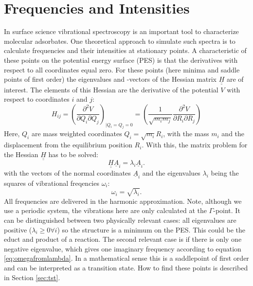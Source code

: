 \documentclass[11pt,DIV=13,BCOR=5mm,a4paper,headinclude]{scrbook}
\renewcommand{\vec}[1]{\underline{#1}}
\def\doubleunderline#1{\underline{\underline{#1}}}
\begin{document}
\section{Frequencies and Intensities}
In surface science vibrational spectroscopy is an important tool to characterize molecular adsorbates.
One theoretical approach to simulate such spectra is to calculate frequencies and their intensities at stationary points.
A characteristic of these points on the potential energy surface (PES) is that the derivatives with respect to all coordinates equal zero.
For these points (here minima and saddle points of first order) the eigenvalues and -vectors of the Hessian matrix $\doubleunderline{H}$ are of interest.
The elements of this Hessian are the derivative of the potential $V$ with respect to coordinates $i$ and $j$:
\begin{equation}
 H_{ij}=\left( \frac{\partial^2 V}{\partial Q_i \partial Q_j} \right)_{|Q_i=Q_j=0}=\left(\frac{1}{\sqrt{m_i m_j}} \frac{\partial^2 V}{\partial R_i \partial R_j} \right)
\end{equation}
Here, $Q_i$ are mass weighted coordinates $Q_i=\sqrt{m_i}R_i$, with the mass $m_i$ and the displacement from the equilibrium position $R_i$.
With this, the matrix problem for the Hessian $\doubleunderline{H}$ has to be solved:
\begin{equation}
 \doubleunderline{H} \vec{A}_i=\lambda_i\vec{A}_i.
\end{equation}
with the vectors of the normal coordinates $\vec{A}_i$ and the eigenvalues $\lambda_i$ being the squares of vibrational freqencies $\omega_i$: 
\begin{equation}\label{eq:omegafromlambda}
 \omega_i=\sqrt{\lambda_i}.
\end{equation}
All frequencies are delivered in the harmonic approximation.
Note, although we use a periodic system, the vibrations here are only calculated at the $\Gamma$-point.
It can be distinguished between two physically relevant cases: all eigenvalues are positive ($\lambda_i\geq 0 \forall i$) so the structure is a minimum on the PES.
This could be the educt and product of a reaction.
The second relevant case is if there is only one negative eigenvalue, which gives one imaginary frequency according to equation \ref{eq:omegafromlambda}.
In a mathematical sense this is a saddlepoint of first order and can be interpreted as a transition state.
How to find these points is described in Section \ref{sec:tst}.
\\\\
\end{document}
